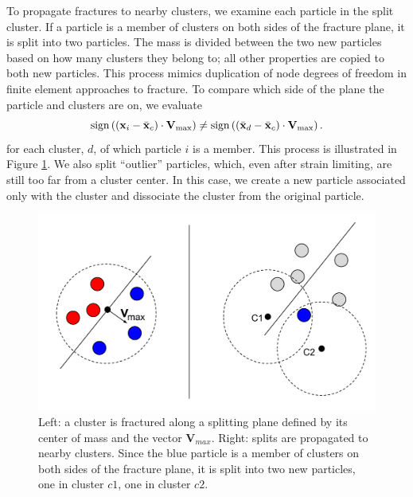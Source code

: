 \documentclass[conference]{acmsiggraph}
\begin{document}
To propagate fractures to nearby clusters, we examine each particle in the split cluster.  If a particle is a member of clusters on both sides of the fracture plane, it is split into two particles.  The mass is divided between the two new particles based on how many clusters they belong to; all other properties are copied to both new particles.  This process mimics duplication of node degrees of freedom in finite element approaches to fracture.  To compare which side of the plane the particle and clusters are on, we evaluate
\begin{equation}
\sign{\left(\B{x}_i-\bar{\B{x}}_{c}\right)\cdot \B{V}_{\max}} \neq %
\sign{\left(\bar{\B{x}}_{d}-\bar{\B{x}}_{c}\right)\cdot \B{V}_{\max}}.
\end{equation} 
for each cluster, $d$, of which particle $i$ is a member.  This process is illustrated in Figure \ref{fig:fractureFig}.
We also split ``outlier'' particles, which, even after strain limiting, are still too far from a cluster center.  
In this case, we create a new particle associated only with the cluster and dissociate the cluster from the original particle.


\begin{figure}
\centerline{\includegraphics[width=0.825\linewidth]{Figures/fractureFigure}}
\caption{Left: a cluster is fractured along a splitting plane defined by its center of mass and the vector $\mathbf{V}_{max}$.  Right: splits are propagated to nearby clusters.   Since the blue particle is a member of clusters on both sides of the fracture plane, it is split into two new particles, one in cluster $c1$, one in cluster $c2$.  }
\label{fig:fractureFig}
\end{figure}


\end{document}
